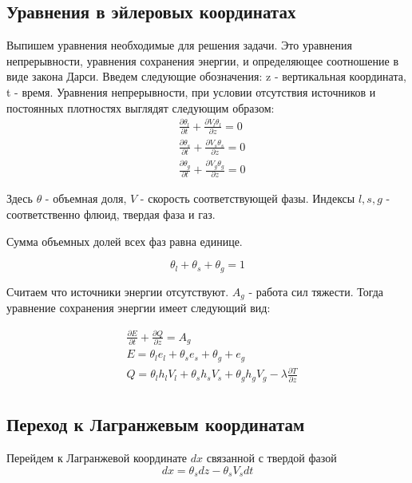 \documentclass[12pt,a4paper]{article}
\newcommand{\pd}[2]{\frac{\partial #1}{\partial #2}}
\begin{document}
\subsection{Уравнения в эйлеровых координатах}
Выпишем уравнения необходимые для решения задачи. Это уравнения непрерывности, уравнения сохранения энергии, и определяющее соотношение в виде закона Дарси. Введем следующие обозначения: z - вертикальная координата, t - время.
Уравнения непрерывности, при условии отсутствия источников и постоянных плотностях выглядят следующим образом:
\begin{equation}
\begin{aligned}
&\pd{\theta_l}{t} + \pd{V_l \theta_l}{z} = 0\\
&\pd{\theta_s}{t} + \pd{V_s \theta_s}{z} = 0\\
&\pd{\theta_g}{t} + \pd{V_g \theta_g}{z} = 0
\end{aligned}
\label{mass_conserv}
\end{equation}

Здесь $\theta$ - объемная доля, $V$ - скорость соответствующей фазы. Индексы $l, s, g$ - соответственно флюид, твердая фаза и газ.

Сумма объемных долей всех фаз равна единице.

\begin{equation}
\theta_l + \theta_s + \theta_g = 1
\end{equation}

Считаем что источники энергии отсутствуют. $A_g$ - работа сил тяжести. Тогда уравнение сохранения энергии имеет следующий вид:

\begin{equation}
\begin{aligned}
&\pd{E}{t} + \pd{Q}{z} = A_g\\
&E = \theta_l e_l + \theta_s e_s + \theta_g + e_g\\
&Q = \theta_l h_l V_l + \theta_s h_s V_s + \theta_g h_g V_g - \lambda \pd{T}{z}\\
\end{aligned}
\label{energy_conserv}
\end{equation}

\subsection{Переход к Лагранжевым координатам}
Перейдем к Лагранжевой координате $dx$ связанной с твердой фазой
\begin{equation}
dx = \theta_s dz - \theta_s V_s dt
\label{dx_dz}
\end{equation}
\end{document}

